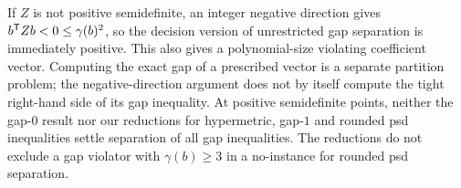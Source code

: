 \begin{remark}\label{rem:general-gap-scope}
If $Z$ is not positive semidefinite, an integer negative direction gives
$b^{\mathsf T} Zb<0\le\gamma(b)^2$, so the decision version of unrestricted
gap separation is immediately positive. This also gives a polynomial-size
violating coefficient vector. Computing the exact gap of a prescribed
vector is a separate partition problem; the negative-direction argument
does not by itself compute the tight right-hand side of its gap
inequality. At positive semidefinite points, neither the gap-$0$ result
nor our reductions for hypermetric, gap-$1$ and rounded psd inequalities
settle separation of all gap inequalities. The reductions do not exclude
a gap violator with $\gamma(b)\ge3$ in a no-instance for rounded psd
separation.
\end{remark}
